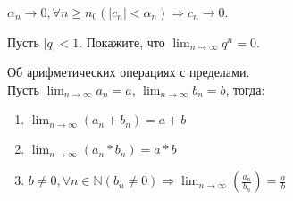     \begin{note}
        $\alpha_{n} \to 0, \forall n \geq n_{0} (|c_{n}| < \alpha_{n}) \Rightarrow c_{n} \to 0$.
    \end{note}

    \begin{problem}
        Пусть $|q| < 1$. Покажите, что $\lim_{n \to \infty} q^{n} = 0$. 
    \end{problem}

    \begin{theorem}
        Об арифметических операциях с пределами.\\
        Пусть $\lim_{n \to \infty} a_{n} = a$, $\lim_{n \to \infty} b_{n} = b$, тогда:
        \begin{enumerate}
            \item $\lim_{n \to \infty}(a_{n} + b_{n}) = a+b$
            \item $\lim_{n \to \infty}(a_{n} * b_{n}) = a*b$
            \item $b \neq 0, \forall n \in \mathds{N} (b_{n} \neq 0) \Rightarrow \lim_{n \to \infty}(\frac{a_{n}}{b_{n}}) = \frac{a}{b}$
        \end{enumerate}
    \end{theorem}

